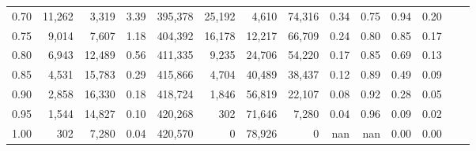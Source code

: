 \begin{tabular}{rrrrrrrrrrrrrr}
0.70 &  11,262 &   3,319 &      3.39 &  395,378 &   25,192 &   4,610 &  74,316 &  0.34 &  0.75 &  0.94 &      0.20 \\
0.75 &   9,014 &   7,607 &      1.18 &  404,392 &   16,178 &  12,217 &  66,709 &  0.24 &  0.80 &  0.85 &      0.17 \\
0.80 &   6,943 &  12,489 &      0.56 &  411,335 &    9,235 &  24,706 &  54,220 &  0.17 &  0.85 &  0.69 &      0.13 \\
0.85 &   4,531 &  15,783 &      0.29 &  415,866 &    4,704 &  40,489 &  38,437 &  0.12 &  0.89 &  0.49 &      0.09 \\
0.90 &   2,858 &  16,330 &      0.18 &  418,724 &    1,846 &  56,819 &  22,107 &  0.08 &  0.92 &  0.28 &      0.05 \\
0.95 &   1,544 &  14,827 &      0.10 &  420,268 &      302 &  71,646 &   7,280 &  0.04 &  0.96 &  0.09 &      0.02 \\
1.00 &     302 &   7,280 &      0.04 &  420,570 &        0 &  78,926 &       0 &   nan &   nan &  0.00 &      0.00 \\
\bottomrule
\end{tabular}
